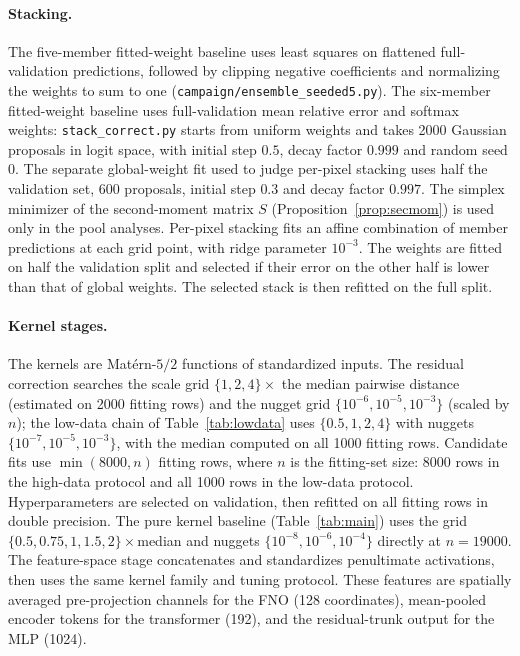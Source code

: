 \paragraph{Stacking.} The five-member fitted-weight baseline uses
least squares on flattened full-validation predictions, followed by clipping
negative coefficients and normalizing the weights to sum to one
(\texttt{campaign/ensemble\_seeded5.py}). The six-member fitted-weight
baseline uses full-validation mean relative error and softmax weights:
\texttt{stack\_correct.py} starts from uniform weights and takes 2000
Gaussian proposals in logit space, with initial step $0.5$, decay factor
$0.999$ and random seed 0. The separate global-weight fit used to judge
per-pixel stacking uses half the validation set, 600 proposals, initial
step $0.3$ and decay factor $0.997$. The
simplex minimizer of the second-moment matrix $S$
(Proposition~\ref{prop:secmom}) is used only in the pool analyses.
Per-pixel stacking fits an affine combination of member predictions at
each grid point, with ridge parameter $10^{-3}$. The weights are fitted
on half the validation split and selected if their error on the other
half is lower than that of global weights. The selected stack is then
refitted on the full split.

\paragraph{Kernel stages.} The kernels are Mat\'ern-$5/2$ functions of
standardized inputs. The residual
correction searches the scale grid
$\{1,2,4\}\times$ the median pairwise distance (estimated on 2000
fitting rows) and the nugget grid $\{10^{-6},10^{-5},10^{-3}\}$ (scaled by $n$); the
low-data chain of Table~\ref{tab:lowdata} uses $\{0.5,1,2,4\}$ with nuggets
$\{10^{-7},10^{-5},10^{-3}\}$, with the median computed on all 1000 fitting
rows. Candidate fits use $\min(8000,n)$ fitting rows, where $n$ is the
fitting-set size: 8000 rows in the high-data protocol and all 1000 rows in
the low-data protocol. Hyperparameters are selected on validation, then
refitted on all fitting rows in double precision. The pure kernel
baseline (Table~\ref{tab:main}) uses the grid
$\{0.5,0.75,1,1.5,2\}\times$median and nuggets $\{10^{-8},10^{-6},10^{-4}\}$
directly at $n=19000$. The feature-space stage concatenates and
standardizes penultimate activations, then uses the same kernel family
and tuning protocol. These features are spatially averaged pre-projection
channels for the FNO (128 coordinates), mean-pooled encoder tokens for the
transformer (192), and the residual-trunk output for the MLP (1024).

